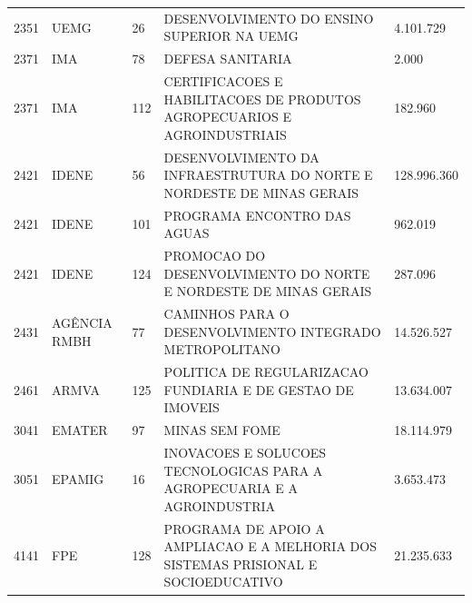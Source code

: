 \documentclass{article}
\begin{document}
\begin{longtable}[c]{m{1cm}|m{1.5cm}|m{1cm}m{10cm}|m{2cm}}
\multicolumn{1}{C{1cm}|}{2351} & \multicolumn{1}{L{1.5cm}|}{UEMG} & \multicolumn{1}{C{1cm}|}{26} & \multicolumn{1}{L{10cm}|}{DESENVOLVIMENTO DO ENSINO SUPERIOR NA UEMG} & \multicolumn{1}{R{2cm}}{4.101.729} \\
\multicolumn{1}{C{1cm}|}{2371} & \multicolumn{1}{L{1.5cm}|}{IMA} & \multicolumn{1}{C{1cm}|}{78} & \multicolumn{1}{L{10cm}|}{DEFESA SANITARIA} & \multicolumn{1}{R{2cm}}{2.000} \\
\multicolumn{1}{C{1cm}|}{2371} & \multicolumn{1}{L{1.5cm}|}{IMA} & \multicolumn{1}{C{1cm}|}{112} & \multicolumn{1}{L{10cm}|}{CERTIFICACOES E HABILITACOES DE PRODUTOS AGROPECUARIOS E AGROINDUSTRIAIS} & \multicolumn{1}{R{2cm}}{182.960} \\
\multicolumn{1}{C{1cm}|}{2421} & \multicolumn{1}{L{1.5cm}|}{IDENE} & \multicolumn{1}{C{1cm}|}{56} & \multicolumn{1}{L{10cm}|}{DESENVOLVIMENTO DA INFRAESTRUTURA DO NORTE E NORDESTE DE MINAS GERAIS} & \multicolumn{1}{R{2cm}}{128.996.360} \\
\multicolumn{1}{C{1cm}|}{2421} & \multicolumn{1}{L{1.5cm}|}{IDENE} & \multicolumn{1}{C{1cm}|}{101} & \multicolumn{1}{L{10cm}|}{PROGRAMA ENCONTRO DAS AGUAS} & \multicolumn{1}{R{2cm}}{962.019} \\
\multicolumn{1}{C{1cm}|}{2421} & \multicolumn{1}{L{1.5cm}|}{IDENE} & \multicolumn{1}{C{1cm}|}{124} & \multicolumn{1}{L{10cm}|}{PROMOCAO DO DESENVOLVIMENTO DO NORTE E NORDESTE DE MINAS GERAIS} & \multicolumn{1}{R{2cm}}{287.096} \\
\multicolumn{1}{C{1cm}|}{2431} & \multicolumn{1}{L{1.5cm}|}{AGÊNCIA RMBH} & \multicolumn{1}{C{1cm}|}{77} & \multicolumn{1}{L{10cm}|}{CAMINHOS PARA O DESENVOLVIMENTO INTEGRADO METROPOLITANO} & \multicolumn{1}{R{2cm}}{14.526.527} \\
\multicolumn{1}{C{1cm}|}{2461} & \multicolumn{1}{L{1.5cm}|}{ARMVA} & \multicolumn{1}{C{1cm}|}{125} & \multicolumn{1}{L{10cm}|}{POLITICA DE REGULARIZACAO FUNDIARIA E DE GESTAO DE IMOVEIS} & \multicolumn{1}{R{2cm}}{13.634.007} \\
\multicolumn{1}{C{1cm}|}{3041} & \multicolumn{1}{L{1.5cm}|}{EMATER} & \multicolumn{1}{C{1cm}|}{97} & \multicolumn{1}{L{10cm}|}{MINAS SEM FOME} & \multicolumn{1}{R{2cm}}{18.114.979} \\
\multicolumn{1}{C{1cm}|}{3051} & \multicolumn{1}{L{1.5cm}|}{EPAMIG} & \multicolumn{1}{C{1cm}|}{16} & \multicolumn{1}{L{10cm}|}{INOVACOES E SOLUCOES TECNOLOGICAS PARA A AGROPECUARIA E A AGROINDUSTRIA} & \multicolumn{1}{R{2cm}}{3.653.473} \\
\multicolumn{1}{C{1cm}|}{4141} & \multicolumn{1}{L{1.5cm}|}{FPE} & \multicolumn{1}{C{1cm}|}{128} & \multicolumn{1}{L{10cm}|}{PROGRAMA DE APOIO A AMPLIACAO E A MELHORIA DOS SISTEMAS PRISIONAL E SOCIOEDUCATIVO} & \multicolumn{1}{R{2cm}}{21.235.633} \\

\end{longtable}
\end{document}
